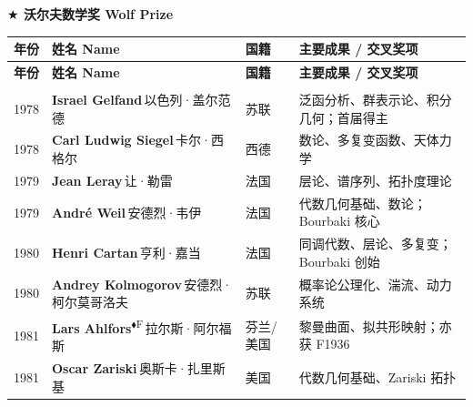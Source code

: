 \documentclass[a4paper,10pt]{article}
\newcommand{\Fbadge}{\textsuperscript{\normalfont\scriptsize\sffamily\color{fieldsclr}$\blacklozenge$F}}
\begin{document}
\begin{center}{\Large\bfseries\sffamily\color{wolfclr} $\bigstar$ 沃尔夫数学奖 Wolf Prize}\end{center}
\vspace{0.3em}
\begin{longtable}{
  >{\raggedright}m{1.8cm}
  >{\raggedright}m{7.0cm}
  >{\raggedright}m{4.2cm}
  >{\raggedright\arraybackslash}m{9.5cm}
}
\toprule
\rowcolor{headerbg}
\textbf{\sffamily 年份} & \textbf{\sffamily 姓名 Name} & \textbf{\sffamily 国籍} & \textbf{\sffamily 主要成果 / 交叉奖项} \\
\midrule
\endfirsthead
\toprule
\rowcolor{headerbg}
\textbf{\sffamily 年份} & \textbf{\sffamily 姓名 Name} & \textbf{\sffamily 国籍} & \textbf{\sffamily 主要成果 / 交叉奖项} \\
\midrule
\endhead
\midrule
\multicolumn{4}{r}{\small\itshape 续下页 \ldots} \\
\endfoot
\bottomrule
\endlastfoot
{\color{yearcolor}1978} & {\bfseries Israel Gelfand}\,{\small\color{mutedgray}以色列·盖尔范德} & 苏联 & {\small\color{fieldcolor}泛函分析、群表示论、积分几何；首届得主} \\[2pt]
{\color{yearcolor}1978} & {\bfseries Carl Ludwig Siegel}\,{\small\color{mutedgray}卡尔·西格尔} & 西德 & {\small\color{fieldcolor}数论、多复变函数、天体力学} \\[2pt]
{\color{yearcolor}1979} & {\bfseries Jean Leray}\,{\small\color{mutedgray}让·勒雷} & 法国 & {\small\color{fieldcolor}层论、谱序列、拓扑度理论} \\[2pt]
{\color{yearcolor}1979} & {\bfseries André Weil}\,{\small\color{mutedgray}安德烈·韦伊} & 法国 & {\small\color{fieldcolor}代数几何基础、数论；Bourbaki 核心} \\[2pt]
{\color{yearcolor}1980} & {\bfseries Henri Cartan}\,{\small\color{mutedgray}亨利·嘉当} & 法国 & {\small\color{fieldcolor}同调代数、层论、多复变；Bourbaki 创始} \\[2pt]
{\color{yearcolor}1980} & {\bfseries Andrey Kolmogorov}\,{\small\color{mutedgray}安德烈·柯尔莫哥洛夫} & 苏联 & {\small\color{fieldcolor}概率论公理化、湍流、动力系统} \\[2pt]
{\color{yearcolor}1981} & {\bfseries Lars Ahlfors}\Fbadge\,{\small\color{mutedgray}拉尔斯·阿尔福斯} & 芬兰/美国 & {\small\color{fieldcolor}黎曼曲面、拟共形映射；亦获 F1936} \\[2pt]
{\color{yearcolor}1981} & {\bfseries Oscar Zariski}\,{\small\color{mutedgray}奥斯卡·扎里斯基} & 美国 & {\small\color{fieldcolor}代数几何基础、Zariski 拓扑} \\[2pt]

\end{longtable}
\end{document}
